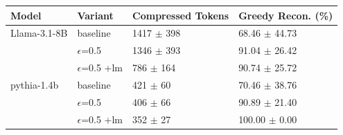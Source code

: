 \begin{tabular}{llll}
\toprule
 Model           & Variant            & Compressed Tokens       & Greedy Recon. (\%)          \\
\midrule
 Llama-3.1-8B    & baseline           & 1417 {\small $\pm$ 398} & 68.46 {\small $\pm$ 44.73} \\
                 & $\epsilon$=0.5     & 1346 {\small $\pm$ 393} & 91.04 {\small $\pm$ 26.42} \\
                 & $\epsilon$=0.5 +lm & 786 {\small $\pm$ 164}  & 90.74 {\small $\pm$ 25.72} \\
 \midrule
 pythia-1.4b     & baseline           & 421 {\small $\pm$ 60}   & 70.46 {\small $\pm$ 38.76} \\
                 & $\epsilon$=0.5     & 406 {\small $\pm$ 66}   & 90.89 {\small $\pm$ 21.40} \\
                 & $\epsilon$=0.5 +lm & 352 {\small $\pm$ 27}   & 100.00 {\small $\pm$ 0.00} \\
\bottomrule
\end{tabular}
